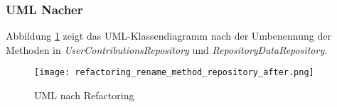 \newpage
\subsubsection{UML Nacher}
Abbildung \ref{fig:RenameMethod_Refactoring_After} zeigt das UML-Klassendiagramm nach der Umbenennung der Methoden in \textit{UserContributionsRepository} und \textit{RepositoryDataRepository}.
\begin{figure}[h]
  \texttt{[image: refactoring\_rename\_method\_repository\_after.png]}
  \caption{UML nach Refactoring}
  \label{fig:RenameMethod_Refactoring_After}
\end{figure}
\newpage